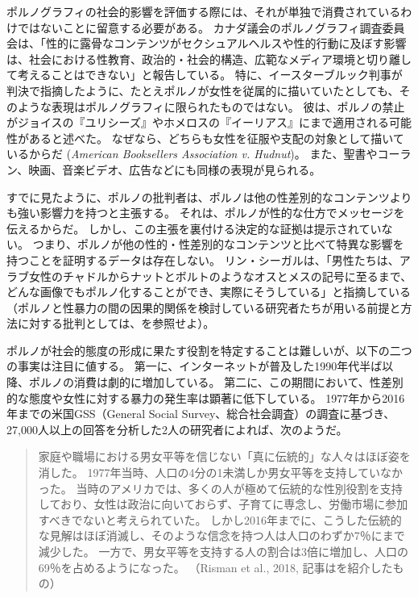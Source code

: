\documentclass[paper=a4,book,openany]{jlreq} \usepackage{mystyle}
\begin{document}
ポルノグラフィの社会的影響を評価する際には、それが単独で消費されているわけではないことに留意する必要がある。
カナダ議会のポルノグラフィ調査委員会は、「性的に露骨なコンテンツがセクシュアルヘルスや性的行動に及ぼす影響は、社会における性教育、政治的・社会的構造、広範なメディア環境と切り離して考えることはできない」と報告している\citep[p.11]{committee17:_repor_public_healt_effec_ease}。
特に、イースターブルック判事が判決で指摘したように、たとえポルノが女性を従属的に描いていたとしても、そのような表現はポルノグラフィに限られたものではない。
彼は、ポルノの禁止がジョイスの『ユリシーズ』やホメロスの『イーリアス』にまで適用される可能性があると述べた。
なぜなら、どちらも女性を征服や支配の対象として描いているからだ
(\emph{American Booksellers Association v. Hudnut})。
また、聖書やコーラン、映画、音楽ビデオ、広告などにも同様の表現が見られる。

すでに見たように、ポルノの批判者は、ポルノは他の性差別的なコンテンツよりも強い影響力を持つと主張する。
それは、ポルノが性的な仕方でメッセージを伝えるからだ。
しかし、この主張を裏付ける決定的な証拠は提示されていない。
つまり、ポルノが他の性的・性差別的なコンテンツと比べて特異な影響を持つことを証明するデータは存在しない。
リン・シーガルは、「男性たちは、アラブ女性のチャドルからナットとボルトのようなオスとメスの記号に至るまで、どんな画像でもポルノ化することができ、実際にそうしている」と指摘している
（ポルノと性暴力の間の因果的関係を検討している研究者たちが用いる前提と方法に対する批判としては、\citet{boyle00:_pornog_debat}を参照せよ）\citep[p.15]{segal93:_does_pornog_cause_violen}。

ポルノが社会的態度の形成に果たす役割を特定することは難しいが、以下の二つの事実は注目に値する。
第一に、インターネットが普及した1990年代半ば以降、ポルノの消費は劇的に増加している。
第二に、この期間において、性差別的な態度や女性に対する暴力の発生率は顕著に低下している。
1977年から2016年までの米国GSS（General Social Survey、総合社会調査）の調査に基づき、27,000人以上の回答を分析した2人の研究者によれば、次のようだ。

\begin{quote}
家庭や職場における男女平等を信じない「真に伝統的」な人々はほぼ姿を消した。
1977年当時、人口の4分の1未満しか男女平等を支持していなかった。
当時のアメリカでは、多くの人が極めて伝統的な性別役割を支持しており、女性は政治に向いておらず、子育てに専念し、労働市場に参加すべきでないと考えられていた。
しかし2016年までに、こうした伝統的な見解はほぼ消滅し、そのような信念を持つ人は人口のわずか7％にまで減少した。
一方で、男女平等を支持する人の割合は3倍に増加し、人口の69％を占めるようになった。
（Risman et al., 2018, 記事は\citet{scarborough19:_attit_stall_gender_revol}を紹介したもの）
\nocite{risman18:_good_news,scarborough19:_attit_stall_gender_revol,risman18:_good_news}
\end{quote}
\end{document}
